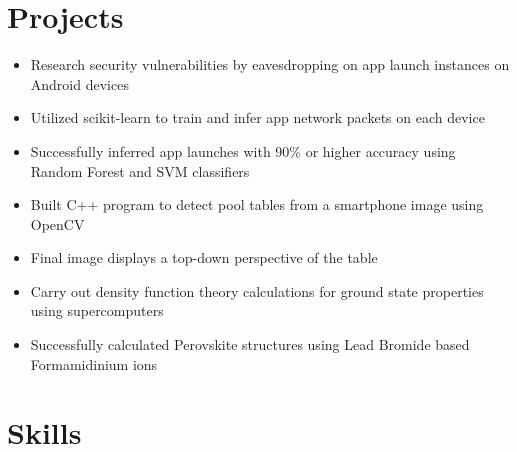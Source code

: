 \documentclass{Custom_CV}
\begin{document}
\section{Projects}
\begin{itemize}[rightmargin=\dimexpr\linewidth-15cm-\leftmargin\relax,noitemsep]
\item Research security vulnerabilities by eavesdropping on app launch instances on Android devices
\item Utilized scikit-learn to train and infer app network packets on each device
\item Successfully inferred app launches with 90\% or higher accuracy using Random Forest and SVM classifiers
\end{itemize}

\begin{itemize}[rightmargin=\dimexpr\linewidth-15cm-\leftmargin\relax,noitemsep]
    \item Built C++ program to detect pool tables from a smartphone image using OpenCV
    \item Final image displays a top-down perspective of the table
\end{itemize}

\begin{itemize}[rightmargin=\dimexpr\linewidth-15cm-\leftmargin\relax,noitemsep]
\item Carry out density function theory calculations for ground state properties using supercomputers
\item Successfully calculated Perovskite structures using Lead Bromide based Formamidinium ions
\end{itemize}
\section{Skills}
\end{document}
